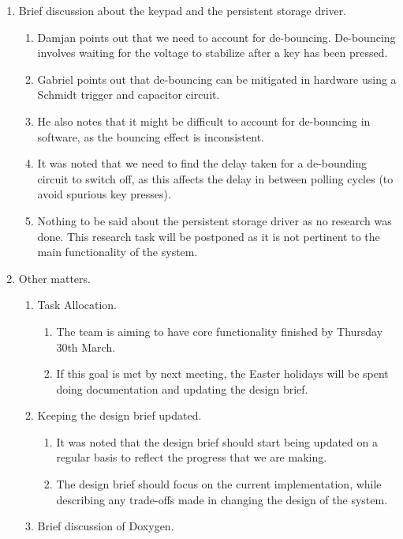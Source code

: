 \documentclass[11pt,a4paper]{scrartcl}
\begin{document}
\begin{enumerate}
   \item Brief discussion about the keypad and the persistent storage driver.
      \begin{enumerate}
         \item Damjan points out that we need to account for de-bouncing. De-bouncing involves waiting for the voltage to stabilize after a key has been pressed.
         \item Gabriel points out that de-bouncing can be mitigated in hardware using a Schmidt trigger and capacitor circuit.
         \item He also notes that it might be difficult to account for de-bouncing in software, as the bouncing effect is inconsistent.
         \item It was noted that we need to find the delay taken for a de-bounding circuit to switch off, as this affects the delay in between polling cycles (to avoid spurious key presses).
         \item Nothing to be said about the persistent storage driver as no research was done. This research task will be postponed as it is not pertinent to the main functionality of the system.
      \end{enumerate}
   
   \item Other matters.
      \begin{enumerate}
         \item Task Allocation.
         \begin{enumerate}
             \item The team is aiming to have core functionality finished by Thursday 30th March.
             \item If this goal is met by next meeting, the Easter holidays will be spent doing documentation and updating the design brief.
         \end{enumerate}
         \item Keeping the design brief updated.
            \begin{enumerate}
                \item It was noted that the design brief should start being updated on a regular basis to reflect the progress that we are making.
                \item The design brief should focus on the current implementation, while describing any trade-offs made in changing the design of the system.
            \end{enumerate}
         \item Brief discussion of Doxygen.
      \end{enumerate}

\end{enumerate}
\end{document}
